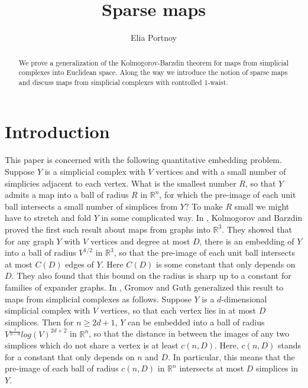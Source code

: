 \documentclass[12pt]{article}
\title{Sparse maps}
\author{Elia Portnoy}
\date{}
\newcommand{\RR}{\mathbb{R}}
\begin{document}
	\maketitle
	
	
	\begin{abstract} 
		We prove a generalization of the Kolmogorov-Barzdin theorem for maps from simplicial complexes into Euclidean space. Along the way we introduce the notion of sparse maps and discuss maps from simplicial complexes with controlled 1-waist.
	\end{abstract}
	
	\section*{\center Introduction}
	
	This paper is concerned with the following quantitative embedding problem. Suppose $Y$ is a simplicial complex with $V$ vertices and with a small number of simplicies adjacent to each vertex. What is the smallest number $R$, so that $Y$ admits a map into a ball of radius $R$ in $\RR^n$, for which the pre-image of each unit ball intersects a small number of simplices from $Y$? To make $R$ small we might have to stretch and fold $Y$ in some complicated way. In \cite{KB}, Kolmogorov and Barzdin proved the first such result about maps from graphs into $\RR^3$. They showed that for any graph $Y$ with $V$ vertices and degree at most $D$, there is an embedding of $Y$ into a ball of radius $V^{1/2}$ in $\mathbb{R}^3$, so that the pre-image of each unit ball intersects at most $C(D)$ edges of $Y$. Here $C(D)$ is some constant that only depends on $D$. They also found that this bound on the radius is sharp up to a constant for families of expander graphs. In \cite{GG}, Gromov and Guth generalized this result to maps from simplicial complexes as follows. Suppose $Y$ is a $d$-dimensional simplicial complex with $V$ vertices, so that each vertex lies in at most $D$ simplices. Then for $n \ge 2d+1$, $Y$ can be embedded into a ball of radius $V^{\frac{1}{n-d}}log(V)^{2d+2}$ in $\mathbb{R}^n$, so that the distance in between the images of any two simplices which do not share a vertex is at least $c(n,D)$. Here, $c(n, D)$ stands for a constant that only depends on $n$ and $D$. In particular, this means that the pre-image of each ball of radius $c(n,D)$ in $\RR^n$ intersects at most $D$ simplices in $Y$.
	
\end{document}
